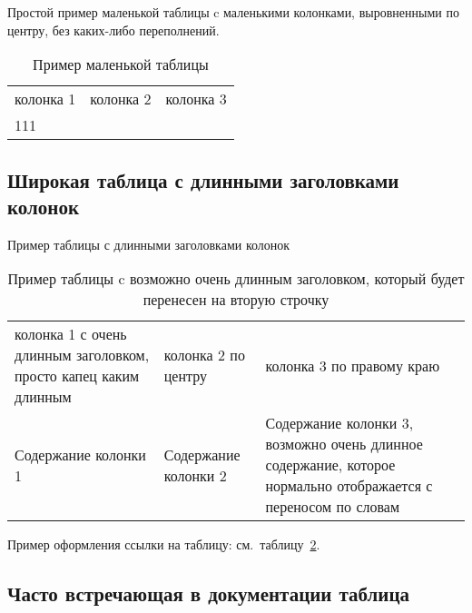 Простой пример маленькой таблицы c маленькими колонками, выровненными по центру, без каких-либо переполнений.
{\tabletextsize
\begin{longtable}[c]{| >{\centering}m{25mm} | >{\centering}m{25mm} | >{\centering}m{50mm} |}
	\caption{\normalsize Пример маленькой таблицы\hspace{25cm}} %
	\label{t:tab0} \\		
	\hline %
	колонка 1 & колонка 2 & колонка 3 \tabularnewline
	\hhline{|=|=|=|} %
	111 & 222 & 333
	\tabularnewline\hline %
\end{longtable}
}

\subsection{Широкая таблица с длинными заголовками колонок}

Пример таблицы с длинными заголовками колонок
{\tabletextsize
\begin{longtable}[c]{| >{\raggedright}m{55mm} | >{\centering}m{55mm} | >{\raggedleft}m{55mm} |}
	\caption{\normalsize Пример таблицы c возможно очень длинным заголовком, который будет перенесен на вторую строчку\hspace{25cm}} %
	\label{t:tab1} \\		
	\hline %
	колонка 1 с очень длинным заголовком, просто капец каким длинным & колонка 2 по центру & колонка 3 по правому краю \tabularnewline
	\hhline{|=|=|=|} %
	Содержание колонки 1 & Содержание колонки 2 & Содержание колонки 3, возможно очень длинное содержание, которое нормально отображается с переносом по словам
	\tabularnewline\hline %
\end{longtable}
}

Пример оформления ссылки на таблицу: см.~таблицу~\ref{t:tab1}.

\newpage
\subsection{Часто встречающая в документации таблица}


